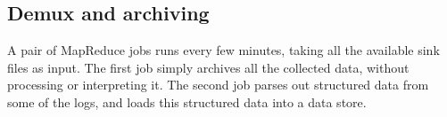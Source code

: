 \documentclass[letterpaper,twocolumn,10pt]{article}
\begin{document}








\subsection{Demux and archiving}

A pair of MapReduce jobs runs every few minutes, taking all the available sink files as input.  The first job simply archives all the collected data, without processing or interpreting it.  The second job parses out structured data from some of the logs, and loads this structured data into a data store.  
\end{document}
